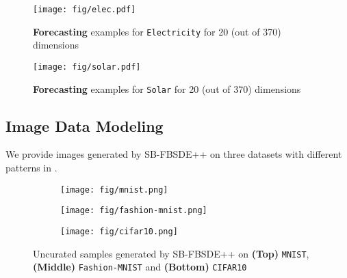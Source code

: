\begin{figure}[!t]
    \centering
    \texttt{[image: fig/elec.pdf]}
    \caption{\small \textbf{Forecasting} examples for \texttt{Electricity} for 20 (out of 370) dimensions}
    \label{fig: ap_fore_elec}
\end{figure}
\begin{figure}[!t]
    \centering
    \texttt{[image: fig/solar.pdf]}
    \caption{\small \textbf{Forecasting} examples for \texttt{Solar} for 20 (out of 370) dimensions}
    \label{fig: ap_fore_solar}
\end{figure}

\subsection{Image Data Modeling}
We provide images generated by SB-FBSDE++ on three datasets with different patterns in .

\begin{figure*}[!t]
    \centering
    \begin{subfigure}[b]{0.9\textwidth}
        \centering
        \texttt{[image: fig/mnist.png]}
    \end{subfigure}
    \begin{subfigure}[b]{0.9\textwidth}
        \centering
        \texttt{[image: fig/fashion-mnist.png]}
    \end{subfigure}
    \begin{subfigure}[b]{0.9\textwidth}
        \centering
        \texttt{[image: fig/cifar10.png]}
    \end{subfigure}
    \caption{\small Uncurated samples generated by SB-FBSDE++ on \textbf{(Top)} \texttt{MNIST}, \textbf{(Middle)} \texttt{Fashion-MNIST} and \textbf{(Bottom)} \texttt{CIFAR10}}

    \label{fig: ap_image}
\end{figure*}

